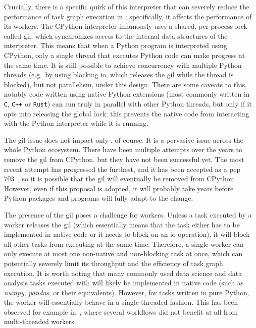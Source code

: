 Crucially, there is a specific quirk of this interpreter that can severely reduce the performance
of task graph execution in \dask{}; specifically, it affects the performance of
its workers. The CPython interpreter infamously uses a shared, per-process lock called
\gls{gil}, which synchronizes access to the internal data structures of the
interpreter. This means that when a Python program is interpreted using CPython, only a single
thread that executes Python code can make progress at the same time. It is still possible to
achieve concurrency with multiple Python threads (e.g.\ by using blocking
\gls{io}, which releases the \gls{gil} while the thread is
blocked), but not parallelism, under this design. There are some caveats to this, notably code
written using native Python extensions (most commonly written in \texttt{C},
\texttt{C++} or \texttt{Rust}) can run truly in parallel with other
Python threads, but only if it opts into releasing the global lock; this prevents the native code
from interacting with the Python interpreter while it is running.

The \gls{gil} issue does not impact only \dask{}, of course.
It is a pervasive issue across the whole Python ecosystem. There have been multiple attempts over
the years to remove the \gls{gil} from CPython, but they have not been successful
yet. The most recent attempt has progressed the furthest, and it has been accepted as a
\gls{pep} 703~\cite{pep703}, so it is possible that the
\gls{gil} will eventually be removed from CPython. However, even if this proposal
is adopted, it will probably take years before Python packages and programs will fully adapt to the
change.

The presence of the \gls{gil} poses a challenge for \dask{}
workers. Unless a task executed by a worker releases the \gls{gil} (which essentially means that the task either has to be
implemented in native code or it needs to block on an \gls{io} operation), it will block
all other tasks from executing at the same time. Therefore, a single \dask{}
worker can only execute at most one non-native and non-blocking task at once, which can potentially
severely limit its throughput and the efficiency of task graph execution. It is worth noting that
many commonly used data science and data analysis tasks executed with \dask{}
will likely be implemented in native code (such as \emph{numpy},
\emph{pandas}, or their \dask{} equivalents). However, for tasks
written in pure Python, the worker will essentially behave in a single-threaded fashion. This has
been observed for example in~\cite{dasksparkcomparison}, where several workflows did not benefit
at all from multi-threaded \dask{} workers.

